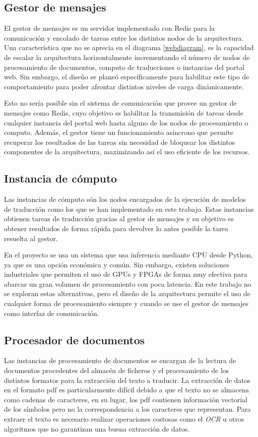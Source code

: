 \subsection{Gestor de mensajes}
El gestor de mensajes es un servidor implementado con Redis para la comunicación y encolado de tareas entre los distintos nodos de la arquitectura. Una característica que no se aprecia en el diagrama \ref{webdiagram}, es la capacidad de escalar la arquitectura horizontalmente incrementando el número de nodos de procesamiento de documentos, computo de traducciones o instancias del portal web. Sin embargo, el diseño se planeó específicamente para habilitar este tipo de comportamiento para poder afrontar distintos niveles de carga dinámicamente.

Esto no sería posible sin el sistema de comunicación que provee un gestor de mensajes como Redis, cuyo objetivo es habilitar la transmisión de tareas desde cualquier instancia del portal web hasta alguno de los nodos de procesamiento o computo. Además, el gestor tiene un funcionamiento asíncrono que permite recuperar los resultados de las tareas sin necesidad de bloquear los distintos componentes de la arquitectura, maximizando así el uso eficiente de los recursos.

\subsection{Instancia de cómputo}
Las instancias de cómputo són los nodos encargados de la ejecución de modelos de traducción como los que se han implementado en este trabajo. 
Estas instancias obtienen tareas de traducción gracias al gestor de mensajes y su objetivo es obtener resultados de forma rápida para devolver lo antes posible la tarea resuelta al gestor.

En el proyecto se usa un sistema que usa inferencia mediante CPU desde Python, ya que es una opción económica y común. Sin embargo, existen soluciones industriales que permiten el uso de GPUs y FPGAs de forma muy efectiva para abarcar un gran volumen de procesamiento con poca latencia. En este trabajo no se exploran estas alternativas, pero el diseño de la arquitectura permite el uso de cualquier forma de procesamiento siempre y cuando se use el gestor de mensajes como interfaz de comunicación.

\subsection{Procesador de documentos}
Las instancias de procesamiento de documentos se encargan de la lectura de documentos procedentes del almacén de ficheros y el procesamiento de los distintos formatos para la extracción del texto a traducir. La extracción de datos en el formato pdf es particularmente difícil debido a que el texto no se almacena como cadenas de caracteres, en su lugar, los pdf contienen información vectorial de los símbolos pero no la correspondencia a los caracteres que representan. Para extraer el texto es necesario realizar operaciones costosas como el \textit{OCR} u otros algoritmos que no garantizan una buena extracción de datos.

